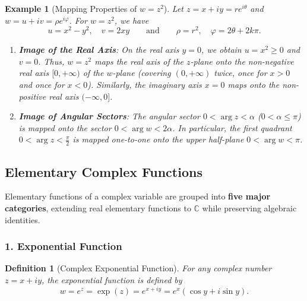 \documentclass[11pt,a4paper]{article}
\theoremstyle{definitionbreak}
\newtheorem{definition}{Definition}
\theoremstyle{examplebreak}
\newtheorem{example}{Example}
\theoremstyle{plain}
\begin{document}
\begin{example}[Mapping Properties of $w = z^2$]
Let $z = x + iy = r e^{i\theta}$ and $w = u + iv = \rho e^{i\varphi}$. For $w = z^2$, we have
\[
    u = x^2 - y^2, \quad v = 2xy \qquad \text{and} \qquad \rho = r^2, \quad \varphi = 2\theta + 2k\pi.
\]
\begin{enumerate}
    \item \textbf{Image of the Real Axis}: On the real axis $y = 0$, we obtain $u = x^2 \ge 0$ and $v = 0$. Thus, $w = z^2$ maps the real axis of the $z$-plane onto the non-negative real axis $[0, +\infty)$ of the $w$-plane (covering $(0, +\infty)$ twice, once for $x > 0$ and once for $x < 0$). Similarly, the imaginary axis $x = 0$ maps onto the non-positive real axis $(-\infty, 0]$.
    \item \textbf{Image of Angular Sectors}: The angular sector $0 < \arg z < \alpha$ ($0 < \alpha \le \pi$) is mapped onto the sector $0 < \arg w < 2\alpha$. In particular, the first quadrant $0 < \arg z < \frac{\pi}{2}$ is mapped one-to-one onto the upper half-plane $0 < \arg w < \pi$.
\end{enumerate}
\end{example}

\subsection{Elementary Complex Functions}

Elementary functions of a complex variable are grouped into \textbf{five major categories}, extending real elementary functions to $\mathbb{C}$ while preserving algebraic identities.

\subsubsection{1. Exponential Function}

\begin{definition}[Complex Exponential Function]
For any complex number $z = x + iy$, the exponential function is defined by
\[
    w = e^z = \exp(z) = e^{x + iy} = e^x (\cos y + i \sin y).
\]
\end{definition}
\end{document}
